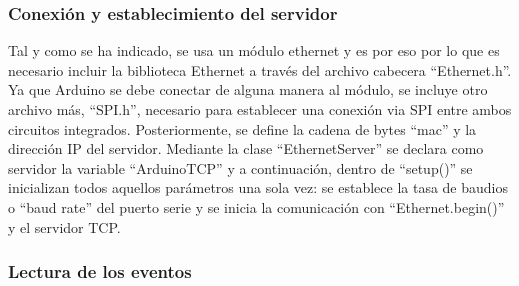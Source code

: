 \subsubsection{Conexión y establecimiento del servidor}\label{s3_5_2_1}

Tal y como se ha indicado, se usa un módulo ethernet y es por eso por lo que es necesario incluir la biblioteca Ethernet a través del archivo cabecera ``Ethernet.h''. Ya que Arduino se debe conectar de alguna manera al módulo, se incluye otro archivo más, ``SPI.h'', necesario para establecer una conexión via SPI entre ambos circuitos integrados. Posteriormente, se define la cadena de bytes ``mac'' y la dirección IP del servidor. Mediante la clase ``EthernetServer'' se declara como servidor la variable ``ArduinoTCP'' y a continuación, dentro de ``setup()'' se inicializan todos aquellos parámetros una sola vez: se establece la tasa de baudios o ``baud rate'' del puerto serie y se inicia la comunicación con ``Ethernet.begin()'' y el servidor TCP.



\subsubsection{Lectura de los eventos}\label{s3_5_2_2}

